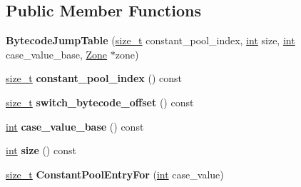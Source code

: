 \subsection*{Public Member Functions}
\begin{DoxyCompactItemize}
\item 
\mbox{\label{classv8_1_1internal_1_1interpreter_1_1BytecodeJumpTable_aa5160dcb39d9345289bad13dbe60adc0}} 
{\bfseries Bytecode\+Jump\+Table} (\mbox{\hyperlink{classsize__t}{size\+\_\+t}} constant\+\_\+pool\+\_\+index, \mbox{\hyperlink{classint}{int}} size, \mbox{\hyperlink{classint}{int}} case\+\_\+value\+\_\+base, \mbox{\hyperlink{classv8_1_1internal_1_1Zone}{Zone}} $\ast$zone)
\item 
\mbox{\label{classv8_1_1internal_1_1interpreter_1_1BytecodeJumpTable_a37b3e3529deffddb90397b82469884fc}} 
\mbox{\hyperlink{classsize__t}{size\+\_\+t}} {\bfseries constant\+\_\+pool\+\_\+index} () const
\item 
\mbox{\label{classv8_1_1internal_1_1interpreter_1_1BytecodeJumpTable_ae2a0c04d2e418aa70c3c052a40cdf1c4}} 
\mbox{\hyperlink{classsize__t}{size\+\_\+t}} {\bfseries switch\+\_\+bytecode\+\_\+offset} () const
\item 
\mbox{\label{classv8_1_1internal_1_1interpreter_1_1BytecodeJumpTable_a81d3071828ab6f260f6f3d6346f0415b}} 
\mbox{\hyperlink{classint}{int}} {\bfseries case\+\_\+value\+\_\+base} () const
\item 
\mbox{\label{classv8_1_1internal_1_1interpreter_1_1BytecodeJumpTable_a966bcc8b37911b1cdd9ca2f53beb733d}} 
\mbox{\hyperlink{classint}{int}} {\bfseries size} () const
\item 
\mbox{\label{classv8_1_1internal_1_1interpreter_1_1BytecodeJumpTable_aab62db51a1f9bc15607f9585dab82515}} 
\mbox{\hyperlink{classsize__t}{size\+\_\+t}} {\bfseries Constant\+Pool\+Entry\+For} (\mbox{\hyperlink{classint}{int}} case\+\_\+value)
\end{DoxyCompactItemize}
